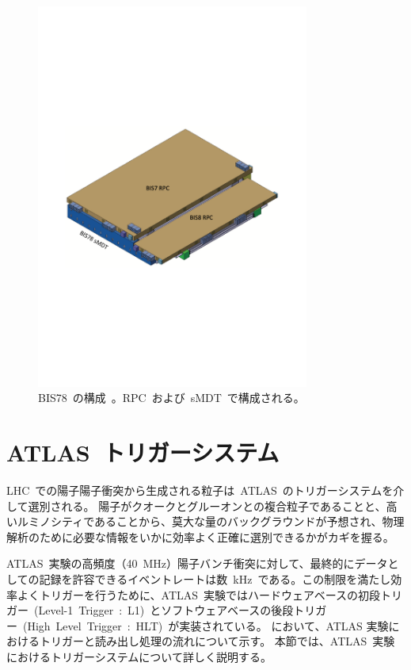 \begin{figure}[H]
        \centering   
        \includegraphics[width=0.8\textwidth,page=1]{img/pdf/bis.pdf}
        \caption[RPC~BIS78~の構成]{BIS78~の構成~\cite{TR:04}。RPC~および~sMDT~で構成される。}
        \label{fig:bis}
\end{figure}

\section{ATLAS~トリガーシステム}\label{sec:ttri}
LHC~での陽子陽子衝突から生成される粒子は~ATLAS~のトリガーシステムを介して選別される。
陽子がクオークとグルーオンとの複合粒子であることと、高いルミノシティであることから、莫大な量のバックグラウンドが予想され、物理解析のために必要な情報をいかに効率よく正確に選別できるかがカギを握る。

ATLAS~実験の高頻度（40~MHz）陽子バンチ衝突に対して、最終的にデータとしての記録を許容できるイベントレートは数~kHz~である。この制限を満たし効率よくトリガーを行うために、ATLAS~実験ではハードウェアベースの初段トリガー~(Level-1~Trigger~:~L1)~とソフトウェアベースの後段トリガー~(High~Level~Trigger~:~HLT)~が実装されている。
において、ATLAS 実験におけるトリガーと読み出し処理の流れについて示す。
本節では、ATLAS~実験におけるトリガーシステムについて詳しく説明する。

